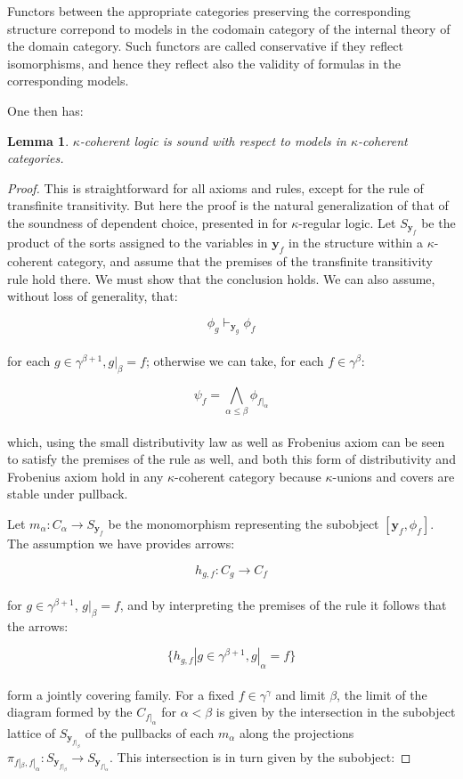 \documentclass[a4paper,11pt]{article}
\theoremstyle{plain}
\newtheorem{lemma}[thm]{Lemma}
\theoremstyle{plain}
\theoremstyle{remark}
\begin{document}
Functors between the appropriate categories preserving the corresponding structure correpond to models in the codomain category of the internal theory of the domain category. Such functors are called conservative if they reflect isomorphisms, and hence they reflect also the validity of formulas in the corresponding models.

One then has:

\begin{lemma}\label{soundness}
$\kappa$-coherent logic is sound with respect to models in $\kappa$-coherent categories.
\end{lemma}

\begin{proof}
 This is straightforward for all axioms and rules, except for the rule of transfinite transitivity. But here the proof is the natural generalization of that of the soundness of dependent choice, presented in \cite{makkai} for $\kappa$-regular logic. Let $S_{\mathbf{y}_{f}}$ be the product of the sorts assigned to the variables in $\mathbf{y}_{f}$ in the structure within a $\kappa$-coherent category, and assume that the premises of the transfinite transitivity rule hold there. We must show that the conclusion holds. We can also assume, without loss of generality, that:
 
 $$\phi_{g} \vdash_{\mathbf{y}_{g}} \phi_{f}$$
 \\
 for each $g \in \gamma^{\beta+1}, g|_{\beta}=f$; otherwise we can take, for each $f \in \gamma^{\beta}$:
 
 $$\psi_{f}=\bigwedge_{\alpha \leq \beta} \phi_{f|_{\alpha}}$$
 \\
 which, using the small distributivity law as well as Frobenius axiom can be seen to satisfy the premises of the rule as well, and both this form of distributivity and Frobenius axiom hold in any $\kappa$-coherent category because $\kappa$-unions and covers are stable under pullback.
 
 Let $m_{\alpha}: C_{\alpha} \to S_{\mathbf{y}_{f}}$ be the monomorphism representing the subobject $[\mathbf{y}_{f}, \phi_{f}]$. The assumption we have provides arrows:
 
 $$h_{g, f}: C_{g} \to C_{f}$$
 \\
 for $g \in \gamma^{\beta+1}$, $g|_{\beta}=f$, and by interpreting the premises of the rule it follows that the arrows:
 
 $$\{h_{g, f} | g \in \gamma^{\beta+1}, g|_{\alpha}=f\}$$
 \\
 form a jointly covering family. For a fixed $f \in \gamma^{\gamma}$ and limit $\beta$, the limit of the diagram formed by the $C_{f|_{\alpha}}$ for $\alpha<\beta$ is given by the intersection in the subobject lattice of $S_{\mathbf{y}_{f|_{\beta}}}$ of the pullbacks of each $m_{\alpha}$ along the projections $\pi_{f|_{\beta}, f|_{\alpha}}: S_{\mathbf{y}_{f|_{\beta}}} \to S_{\mathbf{y}_{f|_{\alpha}}}$. This intersection is in turn given by the subobject:
 

\end{proof}
\end{document}
